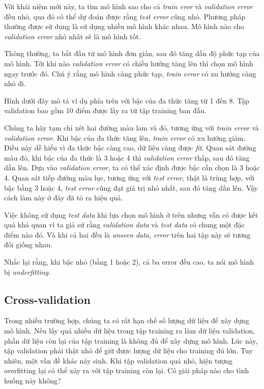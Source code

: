 Với khái niệm mới này, ta tìm mô hình sao cho cả \textit{train eror} và \textit{validation error} đều nhỏ, qua đó có thể dự đoán được rằng \textit{test error} cũng nhỏ. Phương pháp thường được sử dụng là sử dụng nhiều mô hình khác nhau. Mô hình nào cho \textit{validation error} nhỏ nhất sẽ là mô hình tốt. 
 
Thông thường, ta bắt đầu từ mô hình đơn giản, sau đó tăng dần độ phức tạp của mô hình. Tới khi nào \textit{validation error} có chiều hướng tăng lên thì chọn mô hình ngay trước đó. Chú ý rằng mô hình càng phức tạp, \textit{train error} có xu hướng càng nhỏ đi. 
 
Hính dưới đây mô tả ví dụ phía trên với bậc của đa thức tăng từ 1 đến 8. Tập validation bao gồm 10 điểm được lấy ra từ tập training ban đầu. 
 
Chúng ta hãy tạm chỉ xét hai đường màu lam và đỏ, tương ứng với \textit{train error} và \textit{validation error}. Khi bậc của đa thức tăng lên, \textit{train error} có xu hướng giảm. Điều này dễ hiểu vì đa thức bậc càng cao, dữ liệu càng được \textit{fit}. Quan sát đường màu đỏ, khi bậc của đa thức là 3 hoặc 4 thì \textit{validation error} thấp, sau đó tăng dần lên. Dựa vào \textit{validation error}, ta có thể xác định được bậc cần chọn là 3 hoặc 4. Quan sát tiếp đường màu lục, tương ứng với \textit{test error}, thật là trùng hợp, với bậc bằng 3 hoặc 4, \textit{test error} cũng đạt giá trị nhỏ nhất, sau đó tăng dần lên. Vậy cách làm này ở đây đã tỏ ra hiệu quả. 
 
Việc không sử dụng \textit{test data} khi lựa chọn mô hình ở trên nhưng vẫn có được kết quả khả quan vì ta giả sử rằng \textit{validation data} và \textit{test data} có chung một đặc điểm nào đó. Và khi cả hai đều là \textit{unseen data}, \textit{error} trên hai tập này sẽ tương đối giống nhau. 
 
Nhắc lại rằng, khi bậc nhỏ (bằng 1 hoặc 2), cả ba error đều cao, ta nói mô hình bị \textit{underfitting}. 
 
 
 
\subsection{Cross-validation}
Trong nhiều trường hợp, chúng ta có rất hạn chế số lượng dữ liệu để xây dựng mô hình. Nếu lấy quá nhiều dữ liệu trong tập training ra làm dữ liệu validation, phần dữ liệu còn lại của tập training là không đủ để xây dựng mô hình. Lúc này, tập validation phải thật nhỏ để giữ được lượng dữ liệu cho training đủ lớn. Tuy nhiên, một vấn đề khác nảy sinh. Khi tập validation quá nhỏ, hiện tượng overfitting lại có thể xảy ra với tập training còn lại. Có giải pháp nào cho tình huống này không? 
 
